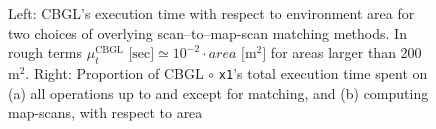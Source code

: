 \begin{figure}
  \vspace{0.5cm}
  
  \vspace{0.6cm}
  \caption{\small Left: CBGL's execution time with respect to environment area
           for two choices of overlying scan--to--map-scan matching methods. In
           rough terms $\mu_t^{\text{CBGL}} \text{ [sec]} \simeq 10^{-2}\cdot area
           \text{ [} \text{m}^2 \text{]}$ for areas larger than 200 m$^2$.
           Right: Proportion of CBGL $\circ$ \texttt{x1}'s total execution time
           spent on (a) all operations up to and except for matching, and (b)
           computing map-scans, with respect to area}
  \vspace{-0.4cm}
  \label{fig:c:time_analysis}
\end{figure}
